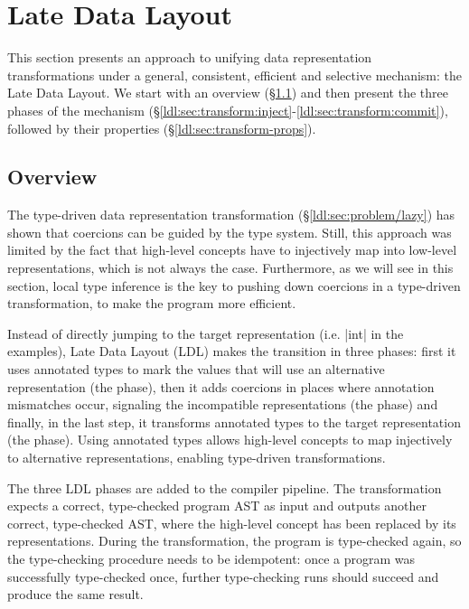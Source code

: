 \section{Late Data Layout}
\label{ldl:sec:transform}

This section presents an approach to unifying data representation transformations under a general, consistent, efficient and selective mechanism: the Late Data Layout. We start with an overview (\S\ref{ldl:sec:transform:how}) and then present the three phases of the mechanism (\S\ref{ldl:sec:transform:inject}-\ref{ldl:sec:transform:commit}), followed by their properties (\S\ref{ldl:sec:transform-props}).

\subsection{Overview}
\label{ldl:sec:transform:how}

The type-driven data representation transformation (\S\ref{ldl:sec:problem/lazy}) has shown that coercions can be guided by the type system. Still, this approach was limited by the fact that high-level concepts have to injectively map into low-level representations, which is not always the case. Furthermore, as we will see in this section, local type inference \cite{odersky-colored-local-type-inf} is the key to pushing down coercions in a type-driven transformation, to make the program more efficient.

Instead of directly jumping to the target representation (i.e. |int| in the examples), Late Data Layout (LDL) makes the transition in three phases: first it uses annotated types to mark the values that will use an alternative representation (the \inject{} phase), then it adds coercions in places where annotation mismatches occur, signaling the incompatible representations (the \coerce{} phase) and finally, in the last step, it transforms annotated types to the target representation (the \commit{} phase). Using annotated types allows high-level concepts to map injectively to alternative representations, enabling type-driven transformations.

The three LDL phases are added to the compiler pipeline. The transformation expects a correct, type-checked program AST as input and outputs another correct, type-checked AST, where the high-level concept has been replaced by its representations. During the transformation, the program is type-checked again, so the type-checking procedure needs to be idempotent: once a program was successfully type-checked once, further type-checking runs should succeed and produce the same result.


